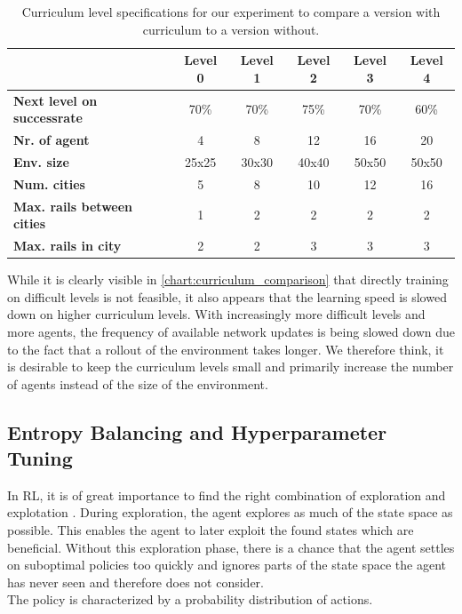 \begin{table}
	\centering
	\begin{tabular}{ |l|c|c|c|c|c| } 
		\hline
		& \textbf{Level 0} 
		& \textbf{Level 1}  
		& \textbf{Level 2} 
		& \textbf{Level 3} 
		& \textbf{Level 4}\\
		\hline
		\textbf{Next level on successrate} & 70\% & 70\% & 75\% & 70\% & 60\% \\  
		\textbf{Nr. of agent} & 4 & 8 & 12 & 16 & 20 \\  
		\textbf{Env. size} & 25x25 & 30x30  & 40x40 & 50x50 & 50x50 \\ 
		\textbf{Num. cities} & 5 & 8 & 10  & 12 & 16 \\ 
		\textbf{Max. rails between cities} & 1 & 2 & 2 & 2 & 2  \\ 
		\textbf{Max. rails in city} & 2 & 2 & 3 & 3 & 3  \\ 
		\hline
	\end{tabular}
	\label{table:curriculum_data}
	\caption{Curriculum level specifications for our experiment to compare a version with curriculum to a version without.}
\end{table}
While it is clearly visible in \autoref{chart:curriculum_comparison} that directly training on difficult levels is not feasible, it also appears that the learning speed is slowed down on higher curriculum levels. With increasingly more difficult levels and more agents, the frequency of available network updates is being slowed down due to the fact that a rollout of the environment takes longer. We therefore think, it is desirable to keep the curriculum levels small and primarily increase the number of agents instead of the size of the environment.
\subsection*{Entropy Balancing and Hyperparameter Tuning}\label{entropy_balancing_hyperparameter}
In RL, it is of great importance to find the right combination of exploration and explotation \cite{explorationexploitation}. During exploration, the agent explores as much of the state space as possible. This enables the agent to later exploit the found states which are beneficial. Without this exploration phase, there is a chance that the agent settles on suboptimal policies too quickly and ignores parts of the state space the agent has never seen and therefore does not consider.\\
The policy is characterized by a probability distribution of actions.

